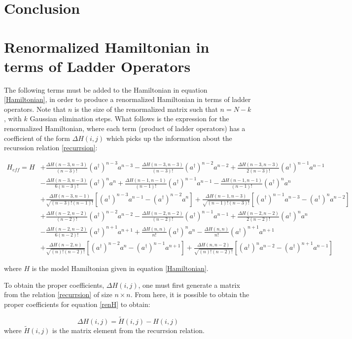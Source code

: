 \documentclass[%
 reprint,
nofootinbib,
 amsmath,amssymb,
 aps,
]{revtex4-2}
\numberwithin{equation}{section}
\begin{document}
\section{Conclusion}



\appendix
\section{Renormalized Hamiltonian in terms of Ladder Operators}
The following terms must be added to the Hamiltonian in equation \ref{Hamiltonian}, in order to produce a renormalized Hamiltonian in terms of ladder operators. Note that $n$ is the size of the renormalized matrix such that $n = N - k$, with $k$ Gaussian elimination steps.
What follows is the expression for the renormalized Hamiltonian, where each term (product of ladder operators) has a coefficient of the form $\Delta H(i,j)$ which picks up the information about the recurssion relation \ref{recurrsion}:

\begin{widetext}
\begin{align}
  \label{renH}
  H_{eff} = H &+ \frac{\Delta H(n-3, n-3)}{(n-3)!}(a^\dagger)^{n-3}a^{n-3} - \frac{\Delta H(n-3, n-3)}{(n-3)!}(a^\dagger)^{n-2}a^{n-2} + \frac{\Delta H(n-3, n-3)}{2(n-3)!}(a^\dagger)^{n-1}a^{n-1}\\ \nonumber
             &- \frac{\Delta H(n-3, n-3)}{6(n-3)!}(a^\dagger)^{n}a^{n} +  \frac{\Delta H(n-1, n-1)}{(n-1)!}(a^\dagger)^{n - 1}a^{n - 1} - \frac{\Delta H(n-1, n-1)}{(n-1)!}(a^\dagger)^{n}a^{n}\\ \nonumber
             &+ \frac{\Delta H(n-3, n-1)}{\sqrt{(n-3)!(n-1)!}}\left[(a^\dagger)^{n-3}a^{n-1} - (a^\dagger)^{n-2}a^{n} \right]+ \frac{\Delta H(n-1, n-3)}{\sqrt{(n-1)!(n-3)!}}\left[(a^\dagger)^{n-1}a^{n-3} - (a^\dagger)^{n}a^{n-2} \right] \\ \nonumber
             &+ \frac{\Delta H(n-2, n-2)}{(n-2)!}(a^\dagger)^{n-2}a^{n-2} - \frac{\Delta H(n-2, n-2)}{(n-2)!}(a^\dagger)^{n-1}a^{n-1} + \frac{\Delta H(n-2, n-2)}{2(n-2)!}(a^\dagger)^{n}a^{n} \\ \nonumber
             &-\frac{\Delta H(n-2, n-2)}{6(n-2)!}(a^\dagger)^{n+1}a^{n+1} + \frac{\Delta H(n, n)}{n!}(a^\dagger)^n a^n -\frac{\Delta H(n, n)}{n!}(a^\dagger)^{n + 1} a^{n + 1} \\ \nonumber
             &+ \frac{\Delta H(n-2, n)}{\sqrt{(n)!(n-2)!}}\left[(a^\dagger)^{n-2}a^{n} - (a^\dagger)^{n-1}a^{n+1} \right]+ \frac{\Delta H(n, n-2)}{\sqrt{(n)!(n-2)!}}\left[(a^\dagger)^{n}a^{n-2} - (a^\dagger)^{n+1}a^{n-1} \right]
\end{align}
\end{widetext}
where $H$ is the model Hamiltonian given in equation \ref{Hamiltonian}.

To obtain the proper coefficients, $\Delta H(i,j)$, one must first generate a matrix from the relation \ref{recurrsion} of size $n \times n$. From here, it is possible to obtain the proper coefficients for equation \ref{renH} to obtain:

\begin{equation}
  \Delta H(i, j) = \tilde{H}(i,j) - H(i,j)
\end{equation}
where $\tilde{H}(i,j)$ is the matrix element from the recurrsion relation.
\end{document}
